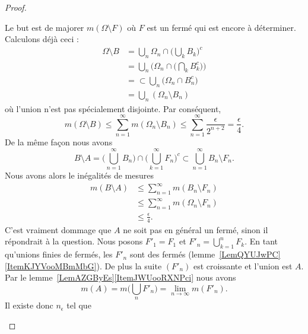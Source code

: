 \begin{proof}
\begin{subproof}
\begin{subproof}
			Le but est de majorer \( m(\Omega\setminus F)\) où \( F\) est un fermé qui est encore à déterminer. Calculons déjà ceci :
			\begin{subequations}
				\begin{align}
					\Omega\setminus B & =\bigcup_n\Omega_n\cap\big( \bigcup_kB_k \big)^c             \\
					                  & =\bigcup_n\Big( \Omega_n\cap\big( \bigcap_kB_k^c \big) \Big) \\
					                  & =\subset\bigcup_n\big( \Omega_n\cap B_n^c \big)              \\
					                  & =\bigcup_n(\Omega_n\setminus B_n)
				\end{align}
			\end{subequations}
			où l'union n'est pas spécialement disjointe. Par conséquent,
			\begin{equation}
				m(\Omega\setminus B)\leq \sum_{n=1}^{\infty}m(\Omega_n\setminus B_n)\leq \sum_{n=1}^{\infty}\frac{ \epsilon }{ 2^{n+2} }=\frac{ \epsilon }{ 4 }.
			\end{equation}
			De la même façon nous avons
			\begin{equation}
				B\setminus A=\big( \bigcup_{n=1}^{\infty}B_n \big)\cap\big( \bigcup_{k=1}^{\infty}F_n \big)^c\subset \bigcup_{n=1}^{\infty}B_n\setminus F_n.
			\end{equation}
			Nous avons alors le inégalités de mesures
			\begin{subequations}
				\begin{align}
					m(B\setminus A) & \leq \sum_{n=1}^{\infty}m(B_n\setminus F_n)      \\
					                & \leq \sum_{n=1}^{\infty}m(\Omega_n\setminus F_n) \\
					                & \leq \frac{ \epsilon }{ 4 }.
				\end{align}
			\end{subequations}
			C'est vraiment dommage que \( A\) ne soit pas en général un fermé, sinon il répondrait à la question. Nous posons \( F'_1=F_1\) et \( F'_n=\bigcup_{k=1}^nF_k\). En tant qu'unions finies de fermés, les \( F'_n\) sont des fermés (lemme~\ref{LemQYUJwPC}\ref{ItemKJYVooMBmMbG}). De plus la suite \( (F'_n)\)  est croissante et l'union est \( A\). Par le lemme~\ref{LemAZGByEs}\ref{ItemJWUooRXNPci} nous avons
			\begin{equation}
				m(A)=m\big( \bigcup_nF'_n \big)=\lim_{n\to \infty} m(F'_n).
			\end{equation}
			Il existe donc \( n_{\epsilon}\) tel que

\end{subproof}
\end{subproof}
\end{proof}
